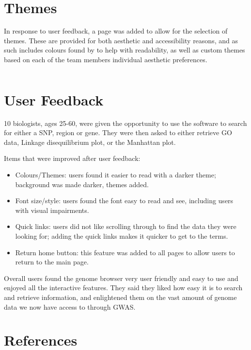 \documentclass[12pt,a4paper]{article}
\newcommand{\sect}[1]{
\clearpage
\hypertarget{#1}{
\section{#1}\label{#1}}
}
\begin{document}
\sect{Themes}

In response to user feedback, a page was added to allow for the selection of themes.
These are provided for both aesthetic and accessibility reasons,
and as such includes colours found by \textcite{AccessColours} to help with readability,
as well as custom themes based on each of the team members individual aesthetic preferences.

\begin{tcolorbox}[colback=gray!5!white,grow to left by=20mm,grow to right by=20mm,sharp corners]
{{    \small \inputminted[breaklines]{javascript}{code_snippets/themes/themes.js}		}}
\end{tcolorbox}




\sect{User Feedback}
10 biologists, ages 25-60, were given the opportunity to use the software to search for either a SNP, region or gene.
They were then asked to either retrieve GO data, Linkage disequilibrium plot, or the Manhattan plot.

Items that were improved after user feedback:

\begin{itemize}
\item Colours/Themes: users found it easier to read with a darker theme; background was made darker, themes added.
\item Font size/style: users found the font easy to read and see, including users with visual impairments.
\item Quick links: users did not like scrolling through to find the data they were looking for; adding the quick links makes it quicker to get to the terms.
\item Return home button: this feature was added to all pages to allow users to return to the main page.
\end{itemize}

Overall users found the genome browser very user friendly and easy to use and enjoyed all the interactive features. They said they liked how easy it is to search and retrieve information, and enlightened them on the vast amount of genome data we now have access to through GWAS.

\sect{References}
\printbibliography[heading=none]
\end{document}
